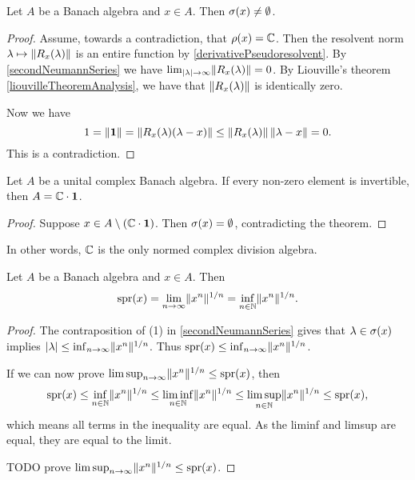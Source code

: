 \begin{proposition}
Let $A$ be a Banach algebra and $x\in A$. Then $\sigma(x)\neq \emptyset$.
\end{proposition}
\begin{proof}
Assume, towards a contradiction, that $\rho(x) = \mathbb{C}$. Then the resolvent norm $\lambda\mapsto \lVert R_x(\lambda)\rVert$ is an entire function by \ref{derivativePseudoresolvent}. By \ref{secondNeumannSeries} we have $\lim_{|\lambda|\to\infty}\lVert R_x(\lambda)\rVert = 0$. By Liouville's theorem \ref{liouvilleTheoremAnalysis}, we have that $\lVert R_x(\lambda)\rVert$ is identically zero.

Now we have
\[ 1 = \lVert\boldsymbol{\mathrm{1}}\rVert = \lVert R_x(\lambda)(\lambda-x)\rVert \leq \lVert R_x(\lambda)\rVert\,\lVert\lambda - x\rVert = 0. \]
This is a contradiction.
\end{proof}
\begin{corollary} \label{GelfandMazur}
Let $A$ be a unital complex Banach algebra. If every non-zero element is invertible, then $A=\mathbb{C}\cdot \boldsymbol{\mathrm{1}}$.
\end{corollary}
\begin{proof}
Suppose $x\in A\setminus (\mathbb{C}\cdot\boldsymbol{\mathrm{1}})$. Then $\sigma(x) = \emptyset$, contradicting the theorem.
\end{proof}
In other words, $\mathbb{C}$ is the only normed complex division algebra.


\begin{proposition} \label{spectralRadiusFormula}
Let $A$ be a Banach algebra and $x\in A$. Then
\[ \operatorname{spr}(x) = \lim_{n\to\infty}\lVert x^n\rVert^{1/n} = \inf_{n\in\mathbb{N}}\lVert x^n\rVert^{1/n}. \]
\end{proposition}
\begin{proof}
The contraposition of (1) in \ref{secondNeumannSeries} gives that $\lambda\in\sigma(x)$ implies $|\lambda| \leq \inf_{n\to \infty}\lVert x^n\rVert^{1/n}$. Thus $\operatorname{spr}(x) \leq \inf_{n\to \infty}\lVert x^n\rVert^{1/n}$.

If we can now prove $\limsup_{n\to\infty}\lVert x^n\rVert^{1/n}\leq \operatorname{spr}(x)$, then
\[ \operatorname{spr}(x) \leq \inf_{n\in\mathbb{N}}\lVert x^n\rVert^{1/n} \leq \liminf_{n\in\mathbb{N}}\lVert x^n\rVert^{1/n} \leq \limsup_{n\in\mathbb{N}}\lVert x^n\rVert^{1/n} \leq \operatorname{spr}(x), \]
which means all terms in the inequality are equal. As the liminf and limsup are equal, they are equal to the limit.

TODO prove $\limsup_{n\to\infty}\lVert x^n\rVert^{1/n}\leq \operatorname{spr}(x)$.
\end{proof}



